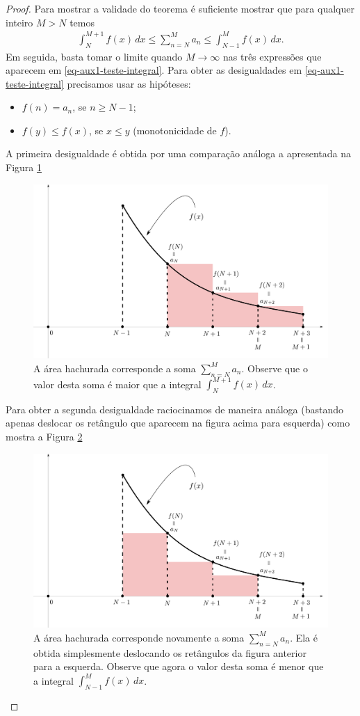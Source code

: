\begin{proof}
Para mostrar a validade do teorema é suficiente mostrar que para qualquer inteiro
$M>N$ temos 
\begin{align}\label{eq-aux1-teste-integral}
\int_{N}^{M+1} f(x)\, dx
\leqslant 
\sum_{n=N}^{M} a_n
\leqslant
\int_{N-1}^{M} f(x)\, dx.
\end{align}
Em seguida, basta tomar o limite quando $M\to\infty$ nas três expressões que aparecem
em \eqref{eq-aux1-teste-integral}. 
Para obter as desigualdades em \eqref{eq-aux1-teste-integral} precisamos usar as hipóteses:
\begin{itemize}
	\item $f(n)=a_n$, se $n\geqslant N-1$;
	\item $f(y)\leqslant f(x)$, se $x\leqslant y$ (monotonicidade de $f$). 
\end{itemize}

A primeira desigualdade é obtida por uma comparação análoga a apresentada na 
Figura \ref{fig:teste-integral-redimensionado1}
\begin{figure}[h]
\centering
\includegraphics[width=0.63\linewidth]{Figuras/teste-integral-redimensionado1}
\caption{A área hachurada corresponde a soma $\sum_{n=N}^{M}a_n$. Observe que 
o valor desta soma é maior que a integral $\int_{N}^{M+1}f(x)\, dx$.}
\label{fig:teste-integral-redimensionado1}
\end{figure}

Para obter a segunda desigualdade raciocinamos de maneira análoga (bastando apenas
deslocar os retângulo que aparecem na figura acima para esquerda) como mostra
a Figura \ref{fig:teste-integral-redimensionado2}
\begin{figure}[h]
\centering
\includegraphics[width=0.63\linewidth]{Figuras/teste-integral-redimensionado2}
\caption{A área hachurada corresponde novamente a soma $\sum_{n=N}^{M}a_n$. Ela é
obtida simplesmente deslocando os retângulos da figura anterior para a esquerda. 
Observe que agora o valor desta soma é menor que a integral $\int_{N-1}^{M}f(x)\, dx$.}
\label{fig:teste-integral-redimensionado2}
\end{figure}
  
  

\end{proof}
